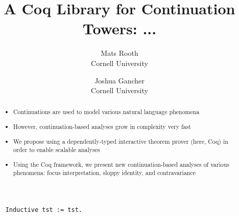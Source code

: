 \documentclass{article}
\begin{document}
\title{A Coq Library for Continuation Towers: ...}
\author{Mats Rooth \\ Cornell University \and Joshua Gancher \\ Cornell University}

\maketitle

\begin{abstract}
    \begin{itemize}
        \item Continuations are used to model various natural language phenomena
        \item However, continuation-based analyses grow in complexity very fast
        \item We propose using a dependently-typed interactive theorem prover (here, Coq)
        in order to enable scalable analyses
        \item Using the Coq framework, we present new continuation-based analyses of various phenomena:
        focus interpretation, sloppy identity, and contravariance
    \end{itemize}
\end{abstract}

\begin{verbatim}
    Inductive tst := tst.
\end{verbatim}
\end{document}
